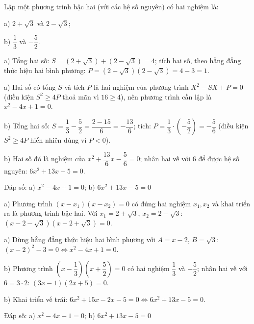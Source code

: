 \begin{problem}[9DS-PT2-028]
Lập một phương trình bậc hai (với các hệ số nguyên) có hai nghiệm là:

a) $2 + \sqrt{3}$ và $2 - \sqrt{3}$;

b) $\dfrac{1}{3}$ và $-\dfrac{5}{2}$.

\begin{solution}
a) Tổng hai số: $S = (2 + \sqrt{3}) + (2 - \sqrt{3}) = 4$; tích hai số, theo hằng đẳng thức hiệu hai bình phương: $P = (2 + \sqrt{3})(2 - \sqrt{3}) = 4 - 3 = 1$.

a) Hai số có tổng $S$ và tích $P$ là hai nghiệm của phương trình $X^2 - SX + P = 0$ (điều kiện $S^2 \geq 4P$ thoả mãn vì $16 \geq 4$), nên phương trình cần lập là $x^2 - 4x + 1 = 0$.

b) Tổng hai số: $S = \dfrac{1}{3} - \dfrac{5}{2} = \dfrac{2 - 15}{6} = -\dfrac{13}{6}$; tích: $P = \dfrac{1}{3} \cdot \left(-\dfrac{5}{2}\right) = -\dfrac{5}{6}$ (điều kiện $S^2 \geq 4P$ hiển nhiên đúng vì $P < 0$).

b) Hai số đó là nghiệm của $x^2 + \dfrac{13}{6}x - \dfrac{5}{6} = 0$; nhân hai vế với $6$ để được hệ số nguyên: $6x^2 + 13x - 5 = 0$.

Đáp số: a) $\boxed{x^2 - 4x + 1 = 0}$; b) $\boxed{6x^2 + 13x - 5 = 0}$
\end{solution}

\begin{solution}
a) Phương trình $(x - x_1)(x - x_2) = 0$ có đúng hai nghiệm $x_1, x_2$ và khai triển ra là phương trình bậc hai. Với $x_1 = 2 + \sqrt{3}$, $x_2 = 2 - \sqrt{3}$: $(x - 2 - \sqrt{3})(x - 2 + \sqrt{3}) = 0$.

a) Dùng hằng đẳng thức hiệu hai bình phương với $A = x - 2$, $B = \sqrt{3}$: $(x - 2)^2 - 3 = 0 \Leftrightarrow x^2 - 4x + 1 = 0$.

b) Phương trình $\left(x - \dfrac{1}{3}\right)\left(x + \dfrac{5}{2}\right) = 0$ có hai nghiệm $\dfrac{1}{3}$ và $-\dfrac{5}{2}$; nhân hai vế với $6 = 3 \cdot 2$: $(3x - 1)(2x + 5) = 0$.

b) Khai triển vế trái: $6x^2 + 15x - 2x - 5 = 0 \Leftrightarrow 6x^2 + 13x - 5 = 0$.

Đáp số: a) $\boxed{x^2 - 4x + 1 = 0}$; b) $\boxed{6x^2 + 13x - 5 = 0}$
\end{solution}
\end{problem}

